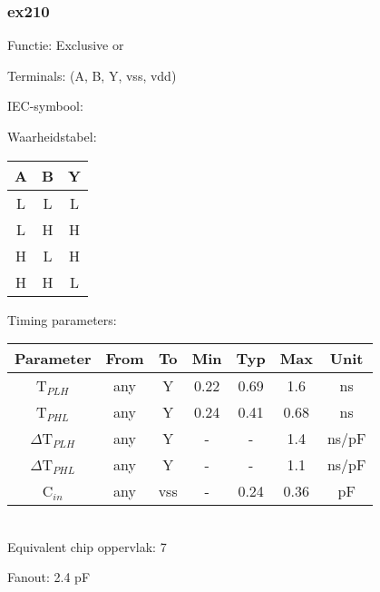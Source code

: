 \subsubsection{ex210}

Functie: Exclusive or

Terminals: (A, B, Y, vss, vdd)


IEC-symbool:
\begin{figure}[bth]
\end{figure}

\begin{minipage}[t]{0.3\textwidth}
Waarheidstabel:\\

\begin{tabular}{|c|c||c|}
\hline
A	&B	&Y\\
\hline
L	&L	&L\\
L	&H	&H\\
H	&L	&H\\
H	&H	&L\\
\hline
\end{tabular}
\end{minipage}
\hfill
\begin{minipage}[t]{0.6\textwidth}
Timing parameters:\\

\begin{tabular}{|c|cc|ccc|c|}
\hline
Parameter               &From            &To   &Min	&Typ	&Max    &Unit\\
\hline
T$_{PLH}$               &any    	&Y     &0.22	&0.69	&1.6    &ns\\
T$_{PHL}$               &any    	&Y     &0.24	&0.41	&0.68    &ns\\
\hline
$\Delta$T$_{PLH}$       &any          	&Y     &-	&-	&1.4    &ns/pF\\
$\Delta$T$_{PHL}$       &any           	&Y     &-	&-	&1.1    &ns/pF\\
\hline
C$_{in}$                &any	    	&vss   &-	&0.24	&0.36   &pF\\
\hline
\end{tabular}
\end{minipage}
\\

Equivalent chip oppervlak: 7

Fanout: 2.4 pF

\clearpage
